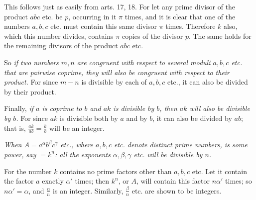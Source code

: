 This follows just as easily from arts. 17, 18. For let any prime divisor of the product $abc$ etc. be $p$, occurring in it $\pi$ times, and it is clear that one of the numbers $a, b, c$ etc. must contain this same divisor $\pi$ times. Therefore $k$ also, which this number divides, contains $\pi$ copies of the divisor $p$. The same holds for the remaining divisors of the product $abc$ etc.

So \emph{if two numbers $m, n$ are congruent with respect to several moduli $a, b, c$ etc. that are pairwise coprime, they will also be congruent with respect to their product.} For since $m-n$ is divisible by each of $a, b, c$ etc., it can also be divided by their product.

Finally, \emph{if $a$ is coprime to $b$ and $ak$ is divisible by $b$, then $ak$ will also be divisible by $b$.} For since $ak$ is divisible both by $a$ and by $b$, it can also be divided by $ab$; that is, $\frac{ak}{ab}=\frac{k}{b}$ will be an integer.

\emph{When $A=a^\alpha b^\beta c^\gamma$ etc., where $a, b, c$ etc. denote distinct prime numbers, is some power, say $=k^n$: all the exponents $\alpha, \beta, \gamma$ etc. will be divisible by $n$.}

For the number $k$ contains no prime factors other than $a, b, c$ etc. Let it contain the factor $a$ exactly $\alpha'$ times; then $k^n$, or $A$, will contain this factor $n\alpha'$ times; so $n\alpha'=\alpha$, and $\frac{\alpha}{n}$ is an integer. Similarly, $\frac{\beta}{n}$ etc. are shown to be integers.
